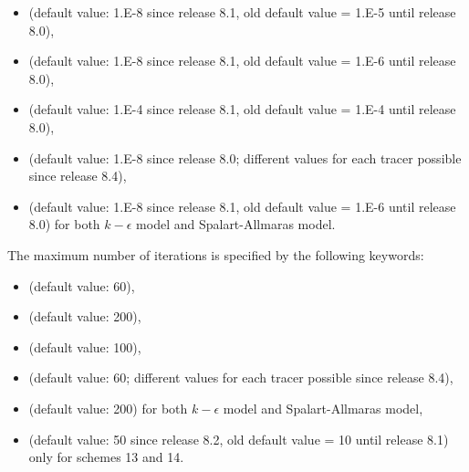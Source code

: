 \begin{itemize}
\item {} (default value: 1.E-8
  since release 8.1, old default value = 1.E-5 until release 8.0),

\item {} (default value: 1.E-8
  since release 8.1, old default value = 1.E-6 until release 8.0),

\item {} (default value: 1.E-4
  since release 8.1, old default value = 1.E-4 until release 8.0),

%
\item {} (default value: 1.E-8
since release 8.0; different values for each tracer possible since release 8.4),

\item {} (default value: 1.E-8
  since release 8.1, old default value = 1.E-6 until release 8.0)
for both $k-\epsilon$ model and Spalart-Allmaras model.
\end{itemize}

The maximum number of iterations is specified by the following keywords:

\begin{itemize}
\item {}
(default value: 60),

\item {} (default value:
200),

\item {} (default value: 100),

%
\item {} (default
value: 60; different values for each tracer possible since release 8.4),

\item {} (default
value: 200) for both $k-\epsilon$ model and Spalart-Allmaras model,

\item {} (default
value: 50 since release 8.2, old default value = 10 until release 8.1)
only for schemes 13 and 14.
\end{itemize}

